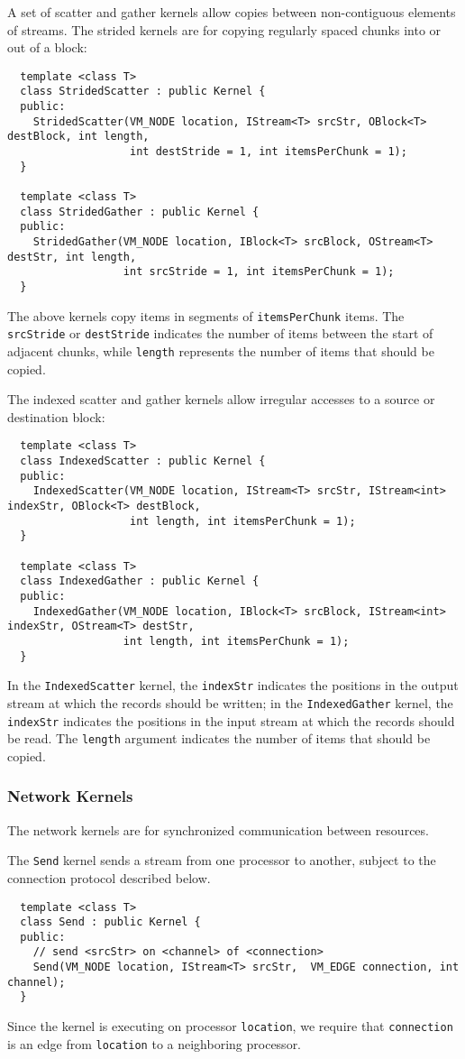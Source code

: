  A set of scatter and gather kernels allow copies
between non-contiguous elements of streams.  The strided kernels are
for copying regularly spaced chunks into or out of a block:
{\small
\begin{verbatim}
  template <class T>
  class StridedScatter : public Kernel {
  public:
    StridedScatter(VM_NODE location, IStream<T> srcStr, OBlock<T> destBlock, int length,
                   int destStride = 1, int itemsPerChunk = 1);
  }

  template <class T>
  class StridedGather : public Kernel {
  public:
    StridedGather(VM_NODE location, IBlock<T> srcBlock, OStream<T> destStr, int length,
                  int srcStride = 1, int itemsPerChunk = 1);
  }  
\end{verbatim}}
The above kernels copy items in segments of {\tt itemsPerChunk} items.
The {\tt srcStride} or {\tt destStride} indicates the number of items
between the start of adjacent chunks, while {\tt length} represents
the number of items that should be copied.

The indexed scatter and gather kernels allow irregular accesses to a
source or destination block:
{\small
\begin{verbatim}
  template <class T>
  class IndexedScatter : public Kernel {
  public:
    IndexedScatter(VM_NODE location, IStream<T> srcStr, IStream<int> indexStr, OBlock<T> destBlock, 
                   int length, int itemsPerChunk = 1);
  }

  template <class T>
  class IndexedGather : public Kernel {
  public:
    IndexedGather(VM_NODE location, IBlock<T> srcBlock, IStream<int> indexStr, OStream<T> destStr, 
                  int length, int itemsPerChunk = 1);
  }  
\end{verbatim}}
In the {\tt IndexedScatter} kernel, the {\tt indexStr} indicates the
positions in the output stream at which the records should be written;
in the {\tt IndexedGather} kernel, the {\tt indexStr} indicates the
positions in the input stream at which the records should be read.
The {\tt length} argument indicates the number of items that should be
copied.

\subsubsection*{Network Kernels}

The network kernels are for synchronized communication between
resources.

 The {\tt Send} kernel sends a stream from one processor to
another, subject to the connection protocol described below.
{\small
\begin{verbatim}
  template <class T>
  class Send : public Kernel {
  public:
    // send <srcStr> on <channel> of <connection>
    Send(VM_NODE location, IStream<T> srcStr,  VM_EDGE connection, int channel);
  }
\end{verbatim}}
Since the kernel is executing on processor {\tt location}, we require
that {\tt connection} is an edge from {\tt location} to a neighboring
processor.

